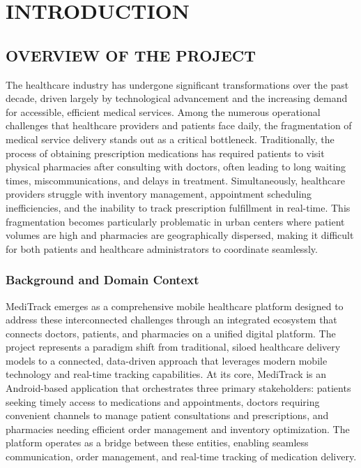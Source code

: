 \documentclass[12pt,a4paper]{report}
\begin{document}
\setcounter{chapter}{0}

\chapter{INTRODUCTION}

\section{OVERVIEW OF THE PROJECT}

The healthcare industry has undergone significant transformations over the past decade, driven largely by technological advancement and the increasing demand for accessible, efficient medical services. Among the numerous operational challenges that healthcare providers and patients face daily, the fragmentation of medical service delivery stands out as a critical bottleneck. Traditionally, the process of obtaining prescription medications has required patients to visit physical pharmacies after consulting with doctors, often leading to long waiting times, miscommunications, and delays in treatment. Simultaneously, healthcare providers struggle with inventory management, appointment scheduling inefficiencies, and the inability to track prescription fulfillment in real-time. This fragmentation becomes particularly problematic in urban centers where patient volumes are high and pharmacies are geographically dispersed, making it difficult for both patients and healthcare administrators to coordinate seamlessly.

\subsection{Background and Domain Context}

MediTrack emerges as a comprehensive mobile healthcare platform designed to address these interconnected challenges through an integrated ecosystem that connects doctors, patients, and pharmacies on a unified digital platform. The project represents a paradigm shift from traditional, siloed healthcare delivery models to a connected, data-driven approach that leverages modern mobile technology and real-time tracking capabilities. At its core, MediTrack is an Android-based application that orchestrates three primary stakeholders: patients seeking timely access to medications and appointments, doctors requiring convenient channels to manage patient consultations and prescriptions, and pharmacies needing efficient order management and inventory optimization. The platform operates as a bridge between these entities, enabling seamless communication, order management, and real-time tracking of medication delivery.
\end{document}
